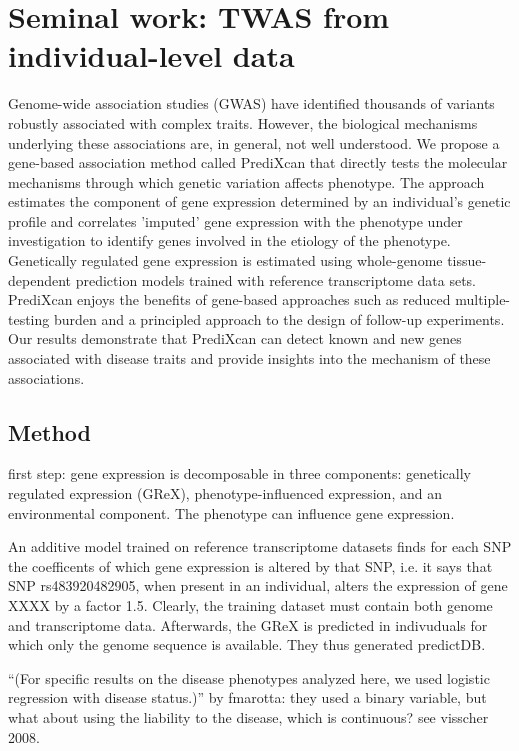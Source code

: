 \documentclass[../main.tex]{subfiles}
\begin{document}
\chapter{Seminal work: TWAS from individual-level data}

\begin{tcolorbox}[title=Abstract]
Genome-wide association studies (GWAS) have identified thousands of 
variants robustly associated with complex traits. However, the 
biological mechanisms underlying these associations are, in general, not 
well understood. We propose a gene-based association method called 
PrediXcan that directly tests the molecular mechanisms through which 
genetic variation affects phenotype. The approach estimates the 
component of gene expression determined by an individual's genetic 
profile and correlates 'imputed' gene expression with the phenotype 
under investigation to identify genes involved in the etiology of the 
phenotype. Genetically regulated gene expression is estimated using 
whole-genome tissue-dependent prediction models trained with reference 
transcriptome data sets. PrediXcan enjoys the benefits of gene-based 
approaches such as reduced multiple-testing burden and a principled 
approach to the design of follow-up experiments. Our results demonstrate 
that PrediXcan can detect known and new genes associated with disease 
traits and provide insights into the mechanism of these associations.
\end{tcolorbox}

\section{Method}

first step: gene expression is decomposable in three components: genetically
regulated expression (GReX), phenotype-influenced expression, and an
environmental component. The phenotype can influence gene expression.

An additive model trained on reference transcriptome datasets finds for each
SNP the coefficents of which gene expression is altered by that SNP, i.e. it
says that SNP rs483920482905, when present in an individual, alters the
expression of gene XXXX by a factor 1.5. Clearly, the training dataset must
contain both genome and transcriptome data. Afterwards, the GReX is predicted
in indivuduals for which only the genome sequence is available. They thus
generated predictDB.

\enquote{(For specific results on the disease phenotypes analyzed here, 
we used logistic regression with disease status.)} by fmarotta: they 
used a binary variable, but what about using the liability to the 
disease, which is continuous? see visscher 2008.
\end{document}
